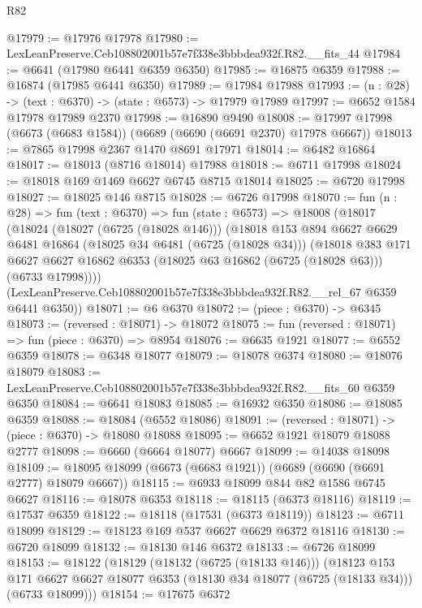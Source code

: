 \begin{lexlean}{R82}
\begin{coremodule}
@17979 := @17976 @17978
@17980 := LexLeanPreserve.Ceb108802001b57e7f338e3bbbdea932f.R82.__fits_44
@17984 := @6641 (@17980 @6441 @6359 @6350)
@17985 := @16875 @6359
@17988 := @16874 (@17985 @6441 @6350)
@17989 := @17984 @17988
@17993 := (n : @28) -> (text : @6370) -> (state : @6573) -> @17979 @17989
@17997 := @6652 @1584 @17978 @17989 @2370
@17998 := @16890 @9490
@18008 := @17997 @17998 (@6673 (@6683 @1584)) (@6689 (@6690 (@6691 @2370) @17978 @6667))
@18013 := @7865 @17998 @2367 @1470 @8691 @17971
@18014 := @6482 @16864
@18017 := @18013 (@8716 @18014) @17988
@18018 := @6711 @17998
@18024 := @18018 @169 @1469 @6627 @6745 @8715 @18014
@18025 := @6720 @17998
@18027 := @18025 @146 @8715
@18028 := @6726 @17998
@18070 := fun (n : @28) =>
  fun (text : @6370) =>
  fun (state : @6573) =>
  @18008
    (@18017
      (@18024
        (@18027 (@6725 (@18028 @146)))
        (@18018
          @153
          @894
          @6627
          @6629
          @6481
          @16864
          (@18025 @34 @6481 (@6725 (@18028 @34)))
          (@18018
            @383
            @171
            @6627
            @6627
            @16862
            @6353
            (@18025 @63 @16862 (@6725 (@18028 @63)))
            (@6733 @17998))))
      (LexLeanPreserve.Ceb108802001b57e7f338e3bbbdea932f.R82.__rel_67 @6359 @6441 @6350))
@18071 := @6 @6370
@18072 := (piece : @6370) -> @6345
@18073 := (reversed : @18071) -> @18072
@18075 := fun (reversed : @18071) => fun (piece : @6370) => @8954
@18076 := @6635 @1921
@18077 := @6552 @6359
@18078 := @6348 @18077
@18079 := @18078 @6374
@18080 := @18076 @18079
@18083 := LexLeanPreserve.Ceb108802001b57e7f338e3bbbdea932f.R82.__fits_60 @6359 @6350
@18084 := @6641 @18083
@18085 := @16932 @6350
@18086 := @18085 @6359
@18088 := @18084 (@6552 @18086)
@18091 := (reversed : @18071) -> (piece : @6370) -> @18080 @18088
@18095 := @6652 @1921 @18079 @18088 @2777
@18098 := @6660 (@6664 @18077) @6667
@18099 := @14038 @18098
@18109 := @18095 @18099 (@6673 (@6683 @1921)) (@6689 (@6690 (@6691 @2777) @18079 @6667))
@18115 := @6933 @18099 @844 @82 @1586 @6745 @6627
@18116 := @18078 @6353
@18118 := @18115 (@6373 @18116)
@18119 := @17537 @6359
@18122 := @18118 (@17531 (@6373 @18119))
@18123 := @6711 @18099
@18129 := @18123 @169 @537 @6627 @6629 @6372 @18116
@18130 := @6720 @18099
@18132 := @18130 @146 @6372
@18133 := @6726 @18099
@18153 := @18122
    (@18129
      (@18132 (@6725 (@18133 @146)))
      (@18123
        @153
        @171
        @6627
        @6627
        @18077
        @6353
        (@18130 @34 @18077 (@6725 (@18133 @34)))
        (@6733 @18099)))
@18154 := @17675 @6372

\end{coremodule}
\end{lexlean}
